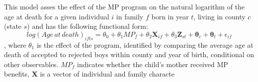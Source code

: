 This model asses the effect of the MP program on the natural logarithm of the age at death for a given individual $i$ in family $f$ born in year $t$, living in county $c$ (state $s$) and has the following functional form:
$$
log(Age\,at\,death)_{ifts} = \theta_0 + \theta_1MP_f + \theta_2\mathbf{X}_{if} + \theta_3\mathbf{Z}_{st} + \mathbf{\theta}_c + \mathbf{\theta}_t + \epsilon_{if}
$$
, where $\theta_1$ is the effect of the program, identified by comparing the average age at death of accepted to rejected boys within county and year of birth, conditional on other observables. $MP_f$ indicates whether the child's mother received MP benefits, $\mathbf{X}$ is a vector of individual and family characte
